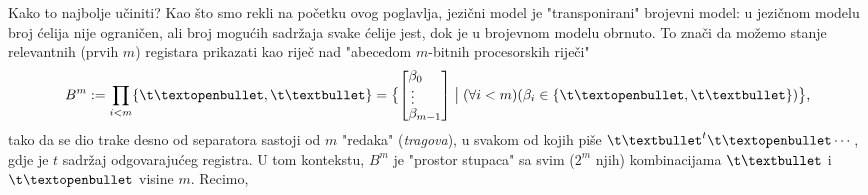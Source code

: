 Kako to najbolje učiniti? Kao što smo rekli na početku ovog poglavlja, jezični model je "transponirani" brojevni model: u jezičnom modelu broj ćelija nije ograničen, ali broj mogućih sadržaja svake ćelije jest, dok je u brojevnom modelu obrnuto. To znači da možemo stanje relevantnih (prvih $m$) registara prikazati kao riječ nad "abecedom $m$-bitnih procesorskih riječi"
\begin{equation}
\renewcommand{\arraystretch}{0.1}
    B^m:=\prod_{i<m}\{\t\textopenbullet,\t\textbullet\}=\bigl\{\left[\begin{array}{@{}l@{}}\beta_0\\[0mm]
        \vdotswithin{\beta}\\[1mm]
    \beta_{m-1}\end{array}\right]\bigm|(\forall i<m)(\beta_i\in\{\t\textopenbullet,\t\textbullet\})\bigr\}\text,
\end{equation}
tako da se dio trake desno od separatora sastoji od $m$ "redaka" (\emph{tragova}), u svakom od kojih piše $\t\textbullet^t\t\textopenbullet\dotsm$, gdje je $t$ sadržaj odgovarajućeg registra. U tom kontekstu, $B^m$ je "prostor stupaca" sa svim ($2^m$ njih) kombinacijama $\t\textbullet$ i $\t\textopenbullet$ visine $m$. Recimo,
